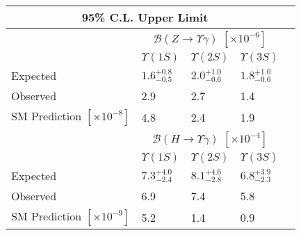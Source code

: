 
\begin{tabular}{l|llll}
\multicolumn{4}{c}{95\% C.L. Upper Limit} \\
\hline
\hline
& \multicolumn{3}{c}{$\mathcal{B}(Z \rightarrow \Upsilon\gamma)$ $[\times10^{-6}]$}      \\
\cline{2-4}
&  $\Upsilon(1S)$ & $\Upsilon(2S)$ & $\Upsilon(3S)$  \\
\hline
Expected     & $1.6^{+0.8}_{-0.5}$ &  $2.0^{+1.0}_{-0.6}$  & $1.8^{+1.0}_{-0.6}$            \\
Observed     & 2.9 &  2.7  & 1.4      \\
\hline
SM Prediction $[\times10^{-8}]$ & 4.8  &  2.4  & 1.9      \\
\hline
\hline
& \multicolumn{3}{c}{$\mathcal{B}(H \rightarrow \Upsilon\gamma)$ $[\times10^{-4}]$}       \\
\cline{2-4}
&  $\Upsilon(1S)$ & $\Upsilon(2S)$ & $\Upsilon(3S)$ &   \\
\hline
Expected     & $7.3^{+4.0}_{-2.4}$ &  $8.1^{+4.6}_{-2.8}$  & $6.8^{+3.9}_{-2.3}$        \\
Observed     & 6.9 &  7.4  & 5.8     \\
\hline
SM Prediction $[\times10^{-9}]$ & 5.2  &  1.4  & 0.9      \\
\hline
\hline
\end{tabular}
	